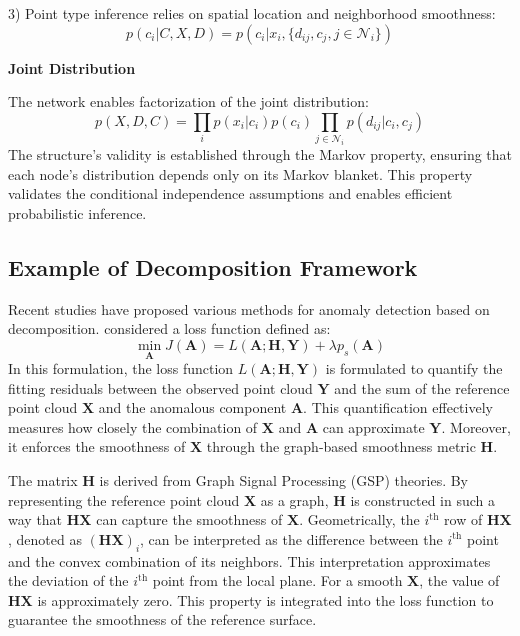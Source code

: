 3) Point type inference relies on spatial location and neighborhood smoothness:
\begin{equation}
p(c_i | C, X, D) = p(c_i | x_i, \{d_{ij}, c_j, j \in \mathcal{N}_i\})
\end{equation}

\textbf{Joint Distribution}

The network enables factorization of the joint distribution:
\begin{equation}
p(X, D, C) = \prod_i p(x_i | c_i)p(c_i) \prod_{j \in \mathcal{N}_i} p(d_{ij} | c_i, c_j)
\end{equation}
The structure's validity is established through the Markov property, ensuring that each node's distribution depends only on its Markov blanket. This property validates the conditional independence assumptions and enables efficient probabilistic inference.

\subsection{Example of Decomposition Framework }
Recent studies have proposed various methods for anomaly detection based on decomposition. \cite{tao2025pointsgrade} considered a loss function defined as:
\begin{equation}
\min_{\mathbf{A}}J(\mathbf{A})=L(\mathbf{A};\mathbf{H},\mathbf{Y})+\lambda p_{s}(\mathbf{A})
\end{equation}
In this formulation, the loss function $L(\mathbf{A};\mathbf{H},\mathbf{Y})$ is formulated to quantify the fitting residuals between the observed point cloud $\mathbf{Y}$ and the sum of the reference point cloud $\mathbf{X}$ and the anomalous component $\mathbf{A}$. This quantification effectively measures how closely the combination of $\mathbf{X}$ and $\mathbf{A}$ can approximate $\mathbf{Y}$. Moreover, it enforces the smoothness of $\mathbf{X}$ through the graph-based smoothness metric $\mathbf{H}$.

The matrix $\mathbf{H}$ is derived from Graph Signal Processing (GSP) theories. By representing the reference point cloud $\mathbf{X}$ as a graph, $\mathbf{H}$ is constructed in such a way that $\mathbf{HX}$ can capture the smoothness of $\mathbf{X}$. Geometrically, the $i^{\text{th}}$ row of $\mathbf{HX}$, denoted as $(\mathbf{HX})_i$, can be interpreted as the difference between the $i^{\text{th}}$ point and the convex combination of its neighbors. This interpretation approximates the deviation of the $i^{\text{th}}$ point from the local plane. For a smooth $\mathbf{X}$, the value of $\mathbf{HX}$ is approximately zero. This property is integrated into the loss function to guarantee the smoothness of the reference surface.

